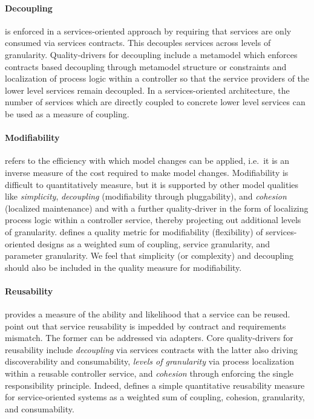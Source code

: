\paragraph{Decoupling} is enforced in a services-oriented approach by requiring that services are only consumed via services contracts. This decouples services across levels of granularity. Quality-drivers for decoupling include a metamodel which enforces contracts based decoupling through metamodel structure or constraints and localization of process logic within a controller so that the service providers of the lower level services remain decoupled. In a services-oriented architecture, the number of services which are directly coupled to concrete lower level services can be used as a measure of coupling\cite{shim_design_2008}.

\paragraph{Modifiability} refers to the efficiency with which model changes can be applied, i.e.\ it is an inverse measure of the cost required to make model changes. Modifiability is difficult to quantitatively measure, but it is supported by other model qualities like \emph{simplicity},  \emph{decoupling} (modifiability through pluggability), and \emph{cohesion} (localized maintenance) and with a further quality-driver in the form of localizing process logic within a controller service, thereby projecting out additional levels of granularity. \cite{shim_design_2008} defines a quality metric for modifiability (flexibility) of services-oriented designs as a weighted sum of coupling, service granularity, and parameter granularity. We feel that simplicity (or complexity) and decoupling should also be included in the quality measure for modifiability.

\paragraph{Reusability} provides a measure of the ability and likelihood that a service can be reused.  \cite{khoshkbarforoushha_metric_2010,choi_quality_2008,feuerlicht_determinants_2007}
\cite{khoshkbarforoushha_metric_2010} point out that service reusability is impedded by contract and requirements mismatch. The former can be addressed via adapters. Core quality-drivers for reusability include \emph{decoupling} via services contracts with the latter also driving discoverability and consumability, \emph{levels of granularity} via process localization within a reusable controller service, and \emph{cohesion} through enforcing the single responsibility principle. Indeed, \cite{shim_design_2008} defines a simple quantitative reusability measure for service-oriented systems as a weighted sum of coupling, cohesion, granularity, and consumability.

